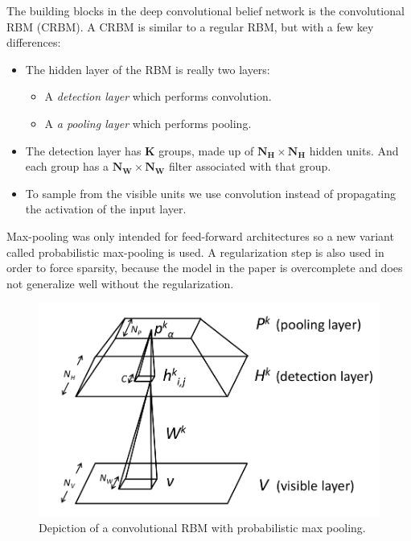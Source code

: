 \documentclass[11pt]{article}
\begin{document}
The building blocks in the deep convolutional belief network is the convolutional RBM (CRBM).  A CRBM is similar to a regular RBM, but with a few key differences:

\begin{itemize}
 \item The hidden layer of the RBM is really two layers:
   \begin{itemize}
           \item A \textit{detection layer} which performs convolution.
            \item A \textit{a pooling layer} which performs pooling.
          \end{itemize}
 \item The detection layer has $\mathbf{K}$ groups, made up of $\mathbf{N_H \times N_H}$ hidden units.  And each group has a $\mathbf{N_W \times N_W}$ filter associated with that group.
 \item To sample from the visible units we use convolution instead of propagating the activation of the input layer.
\end{itemize}

Max-pooling was only intended for feed-forward architectures so a new variant called probabilistic max-pooling is used.  A regularization step is also used in order to force sparsity, because the model in the paper is overcomplete and does not generalize well without the regularization.

\begin{figure}[htb]
  \centering
  \includegraphics[width=\textwidth]{mycdbn.png}
  \caption{Depiction of a convolutional RBM with probabilistic max pooling.}
  \label{fig:crbm}
\end{figure}
\end{document}
